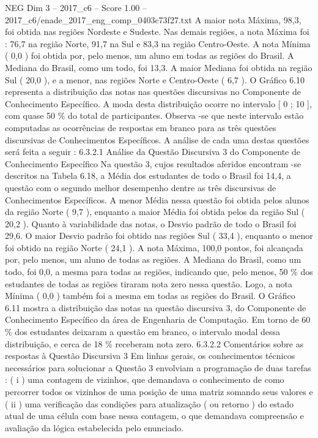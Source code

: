 \begin{textsample}{NEG Dim 3 – 2017\_c6 – Score 1.00 – 2017\_c6/enade\_2017\_eng\_comp\_0403c73f27.txt}
A maior nota Máxima, 98,3, foi obtida nas regiões Nordeste e Sudeste.
Nas demais regiões, a nota Máxima foi : 76,7 na região Norte, 91,7 na Sul e 83,3 na região Centro-Oeste.
A nota Mínima ( 0,0 ) foi obtida por, pelo menos, um aluno em todas as regiões do Brasil.
A Mediana do Brasil, como um todo, foi 13,3.
A maior Mediana foi obtida na região Sul ( 20,0 ), e a menor, nas regiões Norte e Centro-Oeste ( 6,7 ).
O Gráfico 6.10 representa a distribuição das notas nas questões discursivas no Componente de Conhecimento Específico.
A moda desta distribuição ocorre no intervalo [ 0 ; 10 ], com quase 50 \% do total de participantes.
Observa -se que neste intervalo estão computadas as ocorrências de respostas em branco para as três questões discursivas de Conhecimentos Específicos.
A análise de cada uma destas questões será feita a seguir : 6.3.2.1 Análise da Questão Discursiva 3 do Componente de Conhecimento Específico Na questão 3, cujos resultados aferidos encontram -se descritos na Tabela 6.18, a Média dos estudantes de todo o Brasil foi 14,4, a questão com o segundo melhor desempenho dentre as três discursivas de Conhecimentos Específicos.
A menor Média nessa questão foi obtida pelos alunos da região Norte ( 9,7 ), enquanto a maior Média foi obtida pelos da região Sul ( 20,2 ).
Quanto à variabilidade das notas, o Desvio padrão de todo o Brasil foi 29,6.
O maior Desvio padrão foi obtido nas regiões Sul ( 33,4 ), enquanto o menor foi obtido na região Norte ( 24,1 ).
A nota Máxima, 100,0 pontos, foi alcançada por, pelo menos, um aluno de todas as regiões.
A Mediana do Brasil, como um todo, foi 0,0, a mesma para todas as regiões, indicando que, pelo menos, 50 \% dos estudantes de todas as regiões tiraram nota zero nessa questão.
Logo, a nota Mínima ( 0,0 ) também foi a mesma em todas as regiões do Brasil.
O Gráfico 6.11 mostra a distribuição das notas na questão discursiva 3, do Componente de Conhecimento Específico da área de Engenharia de Computação.
Em torno de 60 \% dos estudantes deixaram a questão em branco, o intervalo modal dessa distribuição, e cerca de 18 \% receberam nota zero. 6.3.2.2 Comentários sobre as respostas à Questão Discursiva 3 Em linhas gerais, os conhecimentos técnicos necessários para solucionar a Questão 3 envolviam a programação de duas tarefas : ( i ) uma contagem de vizinhos, que demandava o conhecimento de como percorrer todos os vizinhos de uma posição de uma matriz somando seus valores e ( ii ) uma verificação das condições para atualização ( ou retorno ) do estado atual de uma célula com base nessa contagem, o que demandava compreensão e avaliação da lógica estabelecida pelo enunciado.

\end{textsample}
